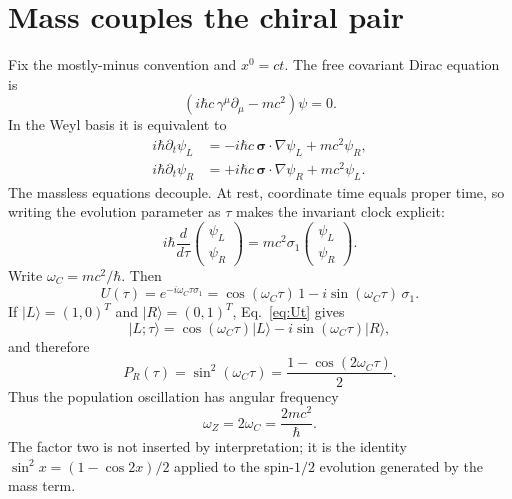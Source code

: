 \documentclass[11pt]{article}
\theoremstyle{definition}\newtheorem{definition}[theorem]{Definition}
\theoremstyle{remark}\newtheorem{remark}[theorem]{Remark}\newtheorem{conjecture}[theorem]{Conjecture}
\begin{document}
\section{Mass couples the chiral pair}
Fix the mostly-minus convention and $x^0=ct$. The free covariant Dirac equation is
\begin{equation}\label{eq:covariantDirac}
 \boxed{\left(i\hbar c\,\gamma^\mu\partial_\mu-mc^2\right)\psi=0.}
\end{equation}
In the Weyl basis it is equivalent to
\begin{align}
 i\hbar\partial_t\psi_L&=-i\hbar c\,\bm\sigma\cdot\nabla\psi_L+mc^2\psi_R,\\
 i\hbar\partial_t\psi_R&=+i\hbar c\,\bm\sigma\cdot\nabla\psi_R+mc^2\psi_L.
\end{align}
The massless equations decouple. At rest, coordinate time equals proper time, so writing the evolution parameter as $\tau$ makes the invariant clock explicit:
\begin{equation}\label{eq:rest}
 i\hbar\frac{d}{d\tau}
 \begin{pmatrix}\psi_L\\\psi_R\end{pmatrix}
 =mc^2\sigma_1
 \begin{pmatrix}\psi_L\\\psi_R\end{pmatrix}.
\end{equation}
Write $\omega_C=mc^2/\hbar$. Then
\begin{equation}\label{eq:Ut}
 U(\tau)=e^{-i\omega_C\tau\sigma_1}
 =\cos(\omega_C\tau)\,1-i\sin(\omega_C\tau)\,\sigma_1.
\end{equation}
If $|L\rangle=(1,0)^T$ and $|R\rangle=(0,1)^T$, Eq.~\eqref{eq:Ut} gives
\begin{equation}\label{eq:chiralevol}
 |L;\tau\rangle=\cos(\omega_C\tau)|L\rangle-i\sin(\omega_C\tau)|R\rangle,
\end{equation}
and therefore
\begin{equation}\label{eq:pop}
 P_R(\tau)=\sin^2(\omega_C\tau)=\frac{1-\cos(2\omega_C\tau)}2.
\end{equation}
Thus the population oscillation has angular frequency
\begin{equation}\label{eq:lock}
 \boxed{\omega_Z=2\omega_C=\frac{2mc^2}{\hbar}}.
\end{equation}
The factor two is not inserted by interpretation; it is the identity $\sin^2x=(1-\cos2x)/2$ applied to the spin-$1/2$ evolution generated by the mass term.
\end{document}
